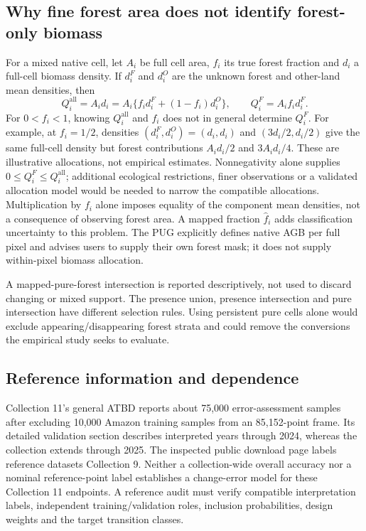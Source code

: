\documentclass[11pt,a4paper]{article}
\begin{document}
\subsection{Why fine forest area does not identify forest-only biomass}
For a mixed native cell, let $A_i$ be full cell area, $f_i$ its true forest fraction and $d_i$ a full-cell biomass density. If $d_i^F$ and $d_i^O$ are the unknown forest and other-land mean densities, then
\begin{equation}
Q_i^{\mathrm{all}}=A_i d_i=A_i\{f_i d_i^F+(1-f_i)d_i^O\},\qquad Q_i^F=A_i f_i d_i^F.
\end{equation}
For $0<f_i<1$, knowing $Q_i^{\mathrm{all}}$ and $f_i$ does not in general determine $Q_i^F$. For example, at $f_i=1/2$, densities $(d_i^F,d_i^O)=(d_i,d_i)$ and $(3d_i/2,d_i/2)$ give the same full-cell density but forest contributions $A_i d_i/2$ and $3A_i d_i/4$. These are illustrative allocations, not empirical estimates. Nonnegativity alone supplies $0\le Q_i^F\le Q_i^{\mathrm{all}}$; additional ecological restrictions, finer observations or a validated allocation model would be needed to narrow the compatible allocations. Multiplication by $f_i$ alone imposes equality of the component mean densities, not a consequence of observing forest area. A mapped fraction $\widehat f_i$ adds classification uncertainty to this problem. The PUG explicitly defines native AGB per full pixel and advises users to supply their own forest mask; it does not supply within-pixel biomass allocation.

A mapped-pure-forest intersection is reported descriptively, not used to discard changing or mixed support. The presence union, presence intersection and pure intersection have different selection rules. Using persistent pure cells alone would exclude appearing/disappearing forest strata and could remove the conversions the empirical study seeks to evaluate.

\subsection{Reference information and dependence}
Collection 11's general ATBD reports about 75,000 error-assessment samples after excluding 10,000 Amazon training samples from an 85,152-point frame. Its detailed validation section describes interpreted years through 2024, whereas the collection extends through 2025. The inspected public download page labels reference datasets Collection 9. Neither a collection-wide overall accuracy nor a nominal reference-point label establishes a change-error model for these Collection 11 endpoints. A reference audit must verify compatible interpretation labels, independent training/validation roles, inclusion probabilities, design weights and the target transition classes.
\end{document}

